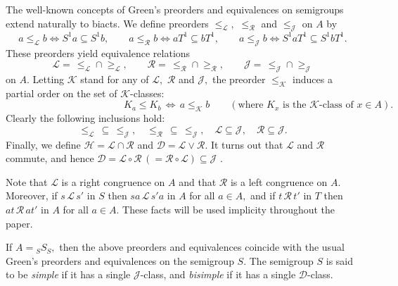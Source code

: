 \documentclass[twoside,a4paper,12pt,reqno]{amsart}
\theoremstyle{plain}
\theoremstyle{definition}
\renewcommand{\l}{\mbox{${\mathcal{L}}$}}
\renewcommand{\r}{\mbox{${\mathcal{R}}$}}
\newcommand{\h}{\mbox{${\mathcal{H}}$}}
\renewcommand{\d}{\mbox{${\mathcal{D}}$}}
\renewcommand{\j}{\mbox{${\mathcal{J}}$}}
\renewcommand{\k}{\mbox{${\mathcal{K}}$}}
\newcommand{\leql}{\leq_{\mathcal{L}}}
\newcommand{\geql}{\geq_{\mathcal{L}}}
\newcommand{\leqr}{\leq_{\mathcal{R}}}
\newcommand{\geqr}{\geq_{\mathcal{R}}}
\newcommand{\leqj}{\leq_{\mathcal{J}}}
\newcommand{\geqj}{\geq_{\mathcal{J}}}
\newcommand{\leqk}{\leq_{\mathcal{K}}}
\newcommand{\sm}{\setminus}
\begin{document}
%

The well-known concepts of Green's preorders and equivalences on semigroups extend naturally to biacts.  We define preorders $\leql,$ $\leqr$ and $\leqj$ on $A$ by
$$a\leql b\Leftrightarrow S^1a\subseteq S^1b,\qquad a\leqr b\Leftrightarrow aT^1\subseteq bT^1,\qquad a\leqj b\Leftrightarrow S^1aT^1\subseteq S^1bT^1.$$
These preorders yield equivalence relations
$$\l=\,\leql\cap\geql,\qquad\r=\,\leqr\cap\geqr,\qquad\j=\,\leqj\cap\geqj$$
on $A.$
Letting $\k$ stand for any of $\l,$ $\r$ and $\j,$ the preorder $\leqk$ induces a partial order on the set of $\k$-classes: 
$$\hspace{12em}K_a\leq K_b\,\Leftrightarrow\,a\leqk b\qquad(\text{where $K_x$ is the $\k$-class of $x\in A$}).$$
Clearly the following inclusions hold: 
$$\leql\,\subseteq\,\leqj,\quad\leqr\,\subseteq\,\leqj,\quad\l\subseteq\j,\quad\r\subseteq\j.$$
Finally, we define $\h=\l\cap\r$ and $\d=\l\vee\r.$  It turns out that $\l$ and $\r$ commute, and hence $\d=\l\circ\r\,(=\r\circ\l)\subseteq\j$ \cite[Remark 1.4.49]{kkm}.  

Note that $\l$ is a right congruence on $A$ and that $\r$ is a left congruence on $A.$  Moreover, if $s\,\l\,s'$ in $S$ then $sa\,\l\,s'a$ in $A$ for all $a\in A,$ and if $t\,\r\,t'$ in $T$ then $at\,\r\,at'$ in $A$ for all $a\in A.$  These facts will be used implicity throughout the paper.

If $A={_S}S_{S},$ then the above preorders and equivalences coincide with the usual Green's preorders and equivalences on the semigroup $S.$  The semigroup $S$ is said to be {\em simple} if it has a single $\j$-class, and {\em bisimple} if it has a single $\d$-class.
\end{document}

